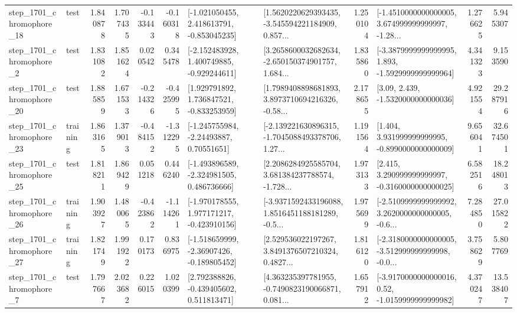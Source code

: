 \begin{tabular}{llrrrrllrlrr}
 step\_1701\_chromophore\_18 &      test &      1.840878 &    1.707435 &     -0.133443 & -0.160318 &   [-1.021050455, 2.418613791, -0.853045235] &  [1.5620220629393435, -3.545594221184909, 0.857... &       1.250104 &  [-1.4510000000000005, 3.674999999999997, -1.28... &            1.276625 &          5.945307 \\
  step\_1701\_chromophore\_2 &      test &      1.831082 &    1.851624 &      0.020542 &  0.345478 &   [-2.152483928, 1.400749885, -0.929244611] &  [3.2658600032682634, -2.650150374901757, 1.684... &       1.835860 &  [-3.3879999999999995, 1.893, -1.5929999999999964] &            4.341323 &          9.153590 \\
 step\_1701\_chromophore\_20 &      test &      1.885859 &    1.671533 &     -0.214326 & -0.425995 &    [1.929791892, 1.736847521, -0.833253959] &  [1.7989408898681893, 3.8973710694216326, -0.58... &       2.178655 &                 [3.09, 2.439, -1.5320000000000036] &            4.921554 &         29.287916 \\
 step\_1701\_chromophore\_23 &  training &      1.863165 &    1.379013 &     -0.484152 & -1.312295 &     [-1.245755984, -2.24493887, 0.70551651] &  [-2.139221630896315, -1.7045088493378706, 1.27... &       1.191564 &    [1.404, 3.931999999999995, -0.8990000000000009] &            9.656041 &         32.674501 \\
 step\_1701\_chromophore\_25 &      test &      1.818211 &    1.869429 &      0.051218 &  0.446240 &   [-1.493896589, -2.324981505, 0.486736666] &  [2.2086284925585704, 3.681384237788574, -1.728... &       1.973133 &    [2.415, 3.290999999999997, -0.3160000000000025] &            6.582516 &         18.248013 \\
 step\_1701\_chromophore\_26 &  training &      1.903927 &    1.480065 &     -0.423862 & -1.114261 &   [-1.970178555, 1.977171217, -0.423910156] &  [-3.9371592433196088, 1.8516451188181289, -0.5... &       1.975699 &  [-2.5109999999999992, 3.2620000000000005, -0.6... &            7.284850 &         27.015822 \\
 step\_1701\_chromophore\_27 &  training &      1.821749 &    1.991922 &      0.170173 &  0.836975 &   [-1.518659999, -2.36907426, -0.189805452] &  [2.529536022197267, 3.8491376507210324, 0.4827... &       1.816120 &  [-2.3180000000000005, -3.512999999999998, -0.0... &            3.758629 &          5.807769 \\
  step\_1701\_chromophore\_7 &      test &      1.797667 &    2.023682 &      0.226015 &  1.020399 &    [2.792388826, -0.439405602, 0.511813471] &  [4.363235397781955, -0.7490823190066871, 0.081... &       1.657912 &   [-3.9170000000000016, 0.52, -1.0159999999999982] &            4.370247 &         13.538407 \\

\end{tabular}
